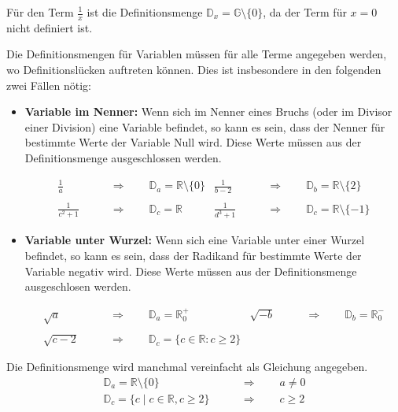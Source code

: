 \begin{example}
  Für den Term $\displaystyle \frac{1}{x}$ ist die Definitionsmenge $\mathbb{D}_{x} = \mathbb{G} \setminus \{0\}$, da der Term für $x = 0$ nicht definiert ist.
\end{example}

Die Definitionsmengen für Variablen müssen für alle Terme angegeben werden, wo Definitionslücken auftreten können. Dies ist insbesondere in den folgenden zwei Fällen nötig:

\begin{itemize}
\item \textbf{Variable im Nenner:} Wenn sich im Nenner eines Bruchs (oder im Divisor einer Division) eine Variable befindet, so kann es sein, dass der Nenner für bestimmte Werte der Variable Null wird. Diese Werte müssen aus der Definitionsmenge ausgeschlossen werden.
  \begin{example}
    \begin{align*}
      \frac{1}{a} \qquad&\Rightarrow\qquad \mathbb{D}_a = \mathbb{R} \setminus \{0\} &
      \frac{1}{b-2} \qquad&\Rightarrow\qquad \mathbb{D}_b = \mathbb{R} \setminus \{2\} \\\\
      \frac{1}{c^{2}+1} \qquad&\Rightarrow\qquad \mathbb{D}_c = \mathbb{R} & \frac{1}{d^{3}+1} \qquad&\Rightarrow\qquad \mathbb{D}_c = \mathbb{R} \setminus \{-1\}
    \end{align*}
  \end{example}

  \item \textbf{Variable unter Wurzel:} Wenn sich eine Variable unter einer Wurzel befindet, so kann es sein, dass der Radikand für bestimmte Werte der Variable negativ wird. Diese Werte müssen aus der Definitionsmenge ausgeschlosen werden.
  \begin{example}
    \begin{align*}
      \sqrt{a}   \qquad&\Rightarrow\qquad \mathbb{D}_a = \mathbb{R}_{0}^{+} &
      \sqrt{-b}  \qquad&\Rightarrow\qquad \mathbb{D}_b = \mathbb{R}_{0}^{-} \\\\
      \sqrt{c-2} \qquad&\Rightarrow\qquad \mathbb{D}_c = \{c \in \mathbb{R} : c \ge 2 \}
    \end{align*}
  \end{example}
\end{itemize}

Die Definitionsmenge wird manchmal vereinfacht als Gleichung angegeben.
\begin{align*}
  \mathbb{D}_a = \mathbb{R} \setminus \{0\} \qquad&\Rightarrow\qquad a \ne 0 \\
  \mathbb{D}_c = \{c\mid c \in \mathbb{R}, c \ge 2 \} \qquad&\Rightarrow\qquad c \ge 2 \\
\end{align*}
